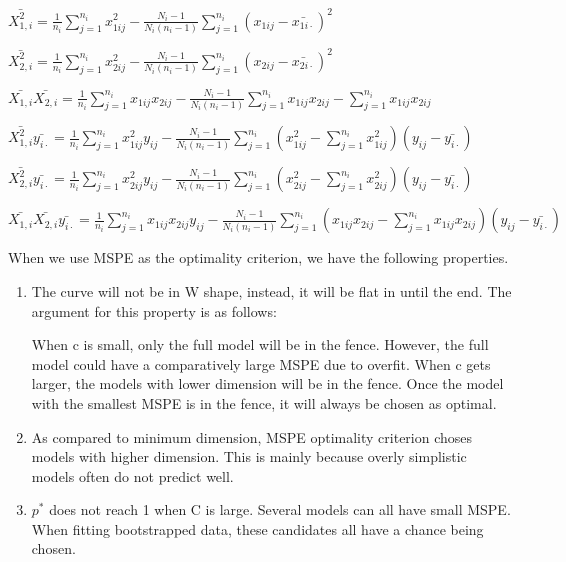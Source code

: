 \documentclass[11pt,letter]{article}
\begin{document}
\hspace{2cm}$ \bar{X_{1,i}^2} =  \frac{1}{n_i}\sum_{j=1}^{n_i}x_{1ij}^2 - \frac{N_i - 1}{N_i(n_i - 1)}\sum_{j=1}^{n_i}(x_{1ij} - \bar{x_{1i\cdot}} )^2  $

\hspace{2cm}$\bar{X_{2,i}^2} =  \frac{1}{n_i}\sum_{j=1}^{n_i}x_{2ij}^2 - \frac{N_i - 1}{N_i(n_i - 1)}\sum_{j=1}^{n_i}(x_{2ij} - \bar{x_{2i\cdot}} )^2  $

\hspace{2cm}$ \bar{X_{1,i}}\bar{X_{2,i}} =  \frac{1}{n_i}\sum_{j=1}^{n_i}x_{1ij}x_{2ij} - \frac{N_i - 1}{N_i(n_i - 1)}\sum_{j=1}^{n_i}x_{1ij}x_{2ij} - \sum_{j=1}^{n_i}x_{1ij}x_{2ij}  $

\hspace{2cm}$ \bar{X_{1,i}^2}\bar{y_{i\cdot}} =  \frac{1}{n_i}\sum_{j=1}^{n_i}x_{1ij}^2y_{ij} - \frac{N_i - 1}{N_i(n_i - 1)}\sum_{j=1}^{n_i}(x_{1ij}^2 - \sum_{j=1}^{n_i}x_{1ij}^2)(y_{ij} - \bar{y_{i\cdot}})  $

\hspace{2cm}$  \bar{X_{2,i}^2}\bar{y_{i\cdot}} =  \frac{1}{n_i}\sum_{j=1}^{n_i}x_{2ij}^2y_{ij} - \frac{N_i - 1}{N_i(n_i - 1)}\sum_{j=1}^{n_i}(x_{2ij}^2 - \sum_{j=1}^{n_i}x_{2ij}^2)(y_{ij} - \bar{y_{i\cdot}})  $

\hspace{2cm}$ \bar{X_{1,i}}\bar{X_{2,i}}\bar{y_{i\cdot}} =  \frac{1}{n_i}\sum_{j=1}^{n_i}x_{1ij}x_{2ij}y_{ij} - \frac{N_i - 1}{N_i(n_i - 1)}\sum_{j=1}^{n_i}(x_{1ij}x_{2ij} - \sum_{j=1}^{n_i}x_{1ij}x_{2ij})(y_{ij} - \bar{y_{i\cdot}})  $


When we use MSPE as the optimality criterion, we have the following properties.
\begin{enumerate}
\item The curve will not be in W shape, instead, it will be flat in until the end.  The argument for this property is as follows: 

 When c is small, only the full model will be in the fence. However, the full model could have a comparatively large MSPE due to overfit. When c gets larger, the models with lower dimension will be in the fence. Once the model with the smallest MSPE is in the fence, it will always be chosen as optimal. 
\item  As compared to minimum dimension, MSPE optimality criterion choses models with higher dimension.  This is mainly because overly simplistic models often do not predict well.
\item $p^{*} $ does not reach 1 when C is large. Several models can all have small MSPE. When fitting bootstrapped data, these candidates all have a chance being chosen.
\end{enumerate}
\end{document}
